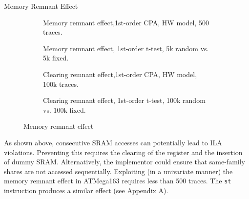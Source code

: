 \begin{subsection}{Memory Remnant Effect}
\begin{figure}[H]
\begin{subfigure}[b]{0.47\textwidth}
        \caption{\scriptsize{Memory remnant effect,1st-order CPA, HW model, 500 traces.}}

    \end{subfigure}
 \begin{subfigure}[b]{0.47\textwidth}

        \caption{\scriptsize{Memory remnant effect, 1st-order t-test, 5k random vs. 5k fixed.}}

    \end{subfigure}
 \begin{subfigure}[b]{0.47\textwidth}

        \caption{\scriptsize{Clearing remnant effect,1st-order CPA, HW model, 100k traces.}}

    \end{subfigure}
 \begin{subfigure}[b]{0.47\textwidth}

        \caption{\scriptsize{Clearing remnant effect, 1st-order t-test, 100k random vs. 100k fixed.}}

    \end{subfigure}

   
    \caption{Memory remnant effect}\label{fig:regleak}
\end{figure}
As shown above, consecutive SRAM accesses can potentially lead to ILA violations. Preventing this requires the clearing of the register and the insertion of dummy SRAM. Alternatively, the implementor could ensure that same-family shares are not accessed sequentially. Exploiting (in a univariate manner) the memory remnant effect in ATMega163 requires less than 500 traces. The \texttt{st} instruction produces a similar effect (see Appendix A).
\end{subsection}
